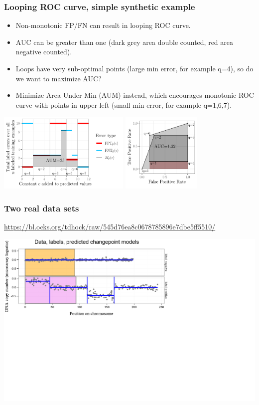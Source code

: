 \documentclass[t]{beamer}
\begin{document}
\begin{frame}
  \frametitle{Looping ROC curve, simple synthetic example}

  \begin{itemize}
  \item Non-monotonic FP/FN can result in looping ROC curve.
  \item AUC can be greater than one (dark grey area double counted,
    red area negative counted).
  \item Loops have very sub-optimal points (large min error, for
    example q=4), so do we want to maximize AUC?
  \item Minimize Area Under Min (AUM) instead, which encourages
    monotonic ROC curve with points in upper left (small min error,
    for example q=1,6,7).
  \end{itemize}
 
  \includegraphics[height=1.5in]{figure-more-than-one-more-aum-nomath}
  \includegraphics[height=1.5in]{figure-more-than-one-more-auc}

\end{frame}

\begin{frame}
  \frametitle{Two real data sets}
  {\scriptsize\url{https://bl.ocks.org/tdhock/raw/545d76ea8c0678785896e7dbe5ff5510/}}
  
  \includegraphics[width=\textwidth]{figure-aum-convexity-interactive-cropped/d4r4-1.PNG}  
\end{frame} 
\end{document}

